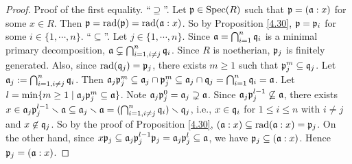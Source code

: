 \begin{proof}
    Proof of the first equality. ``$\supseteq$''. Let $\mathfrak{p} \in \operatorname{Spec}(R)$ such that $\mathfrak{p} = (\mathfrak{a}:x)$ for some $x \in R$. Then $\mathfrak{p} = \operatorname{rad}(\mathfrak{p}) = \operatorname{rad}(\mathfrak{a}:x)$. So by Proposition \ref{4.30}, $\mathfrak{p} = \mathfrak{p}_i$ for some $i \in \{1,\cdots,n\}$. ``$\subseteq$''. Let $j \in \{1,\cdots,n\}$. Since $\mathfrak{a} = \bigcap_{i=1}^{n}\mathfrak{q}_i$ is a minimal primary decomposition, $\mathfrak{a} \subsetneq \bigcap_{i=1, i \neq j}^{n} \mathfrak{q}_i$. Since $R$ is noetherian, $\mathfrak{p}_j$ is finitely generated. Also, since $\operatorname{rad}(\mathfrak{q}_j) = \mathfrak{p}_j$, there exists $m \geq 1$ such that $\mathfrak{p}_j^{m} \subseteq \mathfrak{q}_j$. Let $\mathfrak{a}_j := \bigcap_{i=1,i \neq j}^{n} \mathfrak{q}_i$. Then $\mathfrak{a}_j \mathfrak{p}_j^{m} \subseteq \mathfrak{a}_j \cap \mathfrak{p}_j^{m} \subseteq \mathfrak{a}_j \cap \mathfrak{q}_j = \bigcap_{i=1}^{n} \mathfrak{q}_i = \mathfrak{a}$. Let $l = \min\{m \geq 1 \mid \mathfrak{a}_j \mathfrak{p}_j^{m} \subseteq \mathfrak{a}\}$. Note $\mathfrak{a}_j \mathfrak{p}_j^{0} = \mathfrak{a}_j \supsetneq \mathfrak{a}$. Since $\mathfrak{a}_j \mathfrak{p}_j^{l-1} \not \subseteq \mathfrak{a}$, there exists $x \in \mathfrak{a}_j \mathfrak{p}_j^{l-1} \smallsetminus \mathfrak{a} \subseteq \mathfrak{a}_j \smallsetminus \mathfrak{a} = (\bigcap_{i=1,i \neq j}^{n} \mathfrak{q}_i) \smallsetminus \mathfrak{q}_j $, i.e., $x \in \mathfrak{q}_i$ for $1 \leq i \leq n$ with $i \neq j$ and $x \not \in \mathfrak{q}_j$. So by the proof of Proposition \ref{4.30}, $(\mathfrak{a}:x) \subseteq \operatorname{rad}(\mathfrak{a}:x) = \mathfrak{p}_j$. On the other hand, since $x\mathfrak{p}_j \subseteq \mathfrak{a}_j\mathfrak{p}_j^{l-1}\mathfrak{p}_j = \mathfrak{a}_j \mathfrak{p}_j^{l} \subseteq \mathfrak{a}$, we have $\mathfrak{p}_j \subseteq (\mathfrak{a}:x)$. Hence $\mathfrak{p}_j = (\mathfrak{a}:x)$.
\end{proof}


